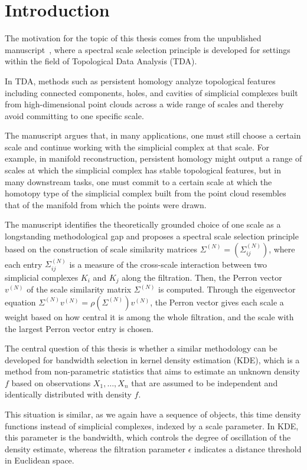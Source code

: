 \chapter{Introduction}\label{chap:intro_meth}

The motivation for the topic of this thesis comes from the unpublished manuscript~\cite{Baralic2026}, where a spectral scale selection principle is developed for settings within the field of Topological Data Analysis (TDA).

In TDA, methods such as persistent homology analyze topological features including connected components, holes, and cavities of simplicial complexes built from high-dimensional point clouds across a wide range of scales and thereby avoid committing to one specific scale.

The manuscript argues that, in many applications, one must still choose a certain scale and continue working with the simplicial complex at that scale. For example, in manifold reconstruction, persistent homology might output a range of scales at which the simplicial complex has stable topological features, but in many downstream tasks, one must commit to a certain scale at which the homotopy type of the simplicial complex built from the point cloud resembles that of the manifold from which the points were drawn.

The manuscript identifies the theoretically grounded choice of one scale as a longstanding methodological gap and proposes a spectral scale selection principle based on the construction of scale similarity matrices $\Sigma^{(N)}=(\Sigma^{(N)}_{ij})$, where each entry $\Sigma_{ij}^{(N)}$ is a measure of the cross-scale interaction between two simplicial complexes $K_i$ and $K_j$ along the filtration. Then, the Perron vector $v^{(N)}$ of the scale similarity matrix $\Sigma^{(N)}$ is computed. Through the eigenvector equation $\Sigma^{(N)}v^{(N)}=\rho(\Sigma^{(N)})v^{(N)}$, the Perron vector gives each scale a weight based on how central it is among the whole filtration, and the scale with the largest Perron vector entry is chosen.

The central question of this thesis is whether a similar methodology can be developed for bandwidth selection in kernel density estimation (KDE), which is a method from non-parametric statistics that aims to estimate an unknown density $f$ based on observations $X_1,\dots,X_n$ that are assumed to be independent and identically distributed with density $f$.

This situation is similar, as we again have a sequence of objects, this time density functions instead of simplicial complexes, indexed by a scale parameter. In KDE, this parameter is the bandwidth, which controls the degree of oscillation of the density estimate, whereas the filtration parameter $\epsilon$ indicates a distance threshold in Euclidean space.

